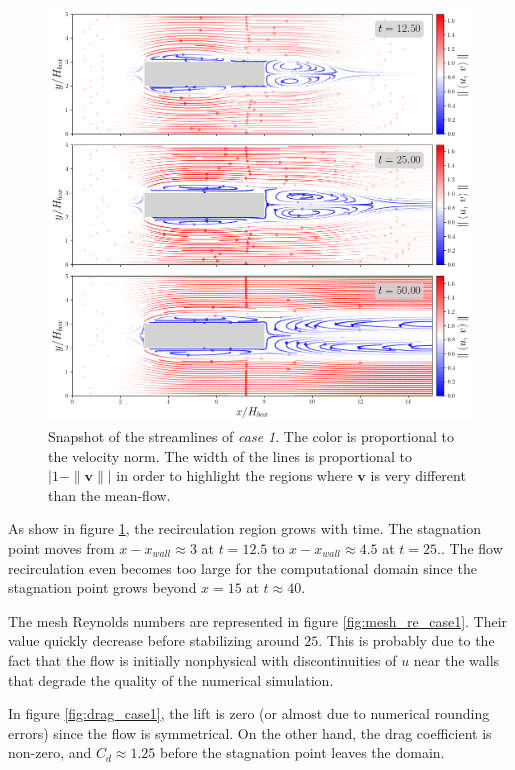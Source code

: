 \documentclass[11 pt]{article}
\begin{document}
\begin{figure}[H]
    \centering
    \includegraphics[width=\textwidth]{../figures/streamlines_case_1.png}
    \caption{Snapshot of the streamlines of \textit{case 1}. The color is proportional to the velocity norm. The width of the lines is proportional to $\left|1 - \|\mathbf{v}\|\right|$ in order to highlight the regions where $\mathbf{v}$ is very different than the mean-flow.}
    \label{fig:streamlines_1}
\end{figure}
As show in figure \ref{fig:streamlines_1}, the recirculation region grows with time. The stagnation point moves from $x-x_{wall} \approx 3$ at $t=12.5$ to $x - x_{wall} \approx 4.5$ at $t=25.$. The flow recirculation even becomes too large for the computational domain since the stagnation point grows beyond $x=15$ at $t \approx 40$.

The mesh Reynolds numbers are represented in figure \ref{fig:mesh_re_case1}. Their value quickly decrease before stabilizing around $25$. This is probably due to the fact that the flow is initially nonphysical with discontinuities of $u$ near the walls that degrade the quality of the numerical simulation.

In figure \ref{fig:drag_case1}, the lift is zero (or almost due to numerical rounding errors) since the flow is symmetrical. On the other hand, the drag coefficient is non-zero, and $C_d \approx 1.25$ before the stagnation point leaves the domain.
\end{document}
